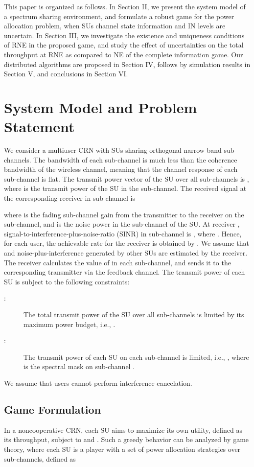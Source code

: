 \documentclass[peerreview,onecolumn,11pt,draftclsnofoot]{IEEEtran}\usepackage{amsmath}\usepackage{amsfonts}\usepackage{epsfig}\usepackage{amssymb}\usepackage{graphicx}\usepackage{amssymb,amsmath}\usepackage{cite}\usepackage{color,soul}\newcommand\T{\rule{0pt}{3.1ex}}
\begin{document}
This paper is organized as follows. In Section II, we present the system model of a spectrum sharing environment, and formulate a robust game for the power allocation problem, when SUs channel state information and IN levels are uncertain. In Section III, we investigate the existence and uniqueness conditions of RNE in the proposed game, and study the effect of uncertainties on the total throughput at RNE as compared to NE of the complete information game. Our distributed algorithms are proposed in Section IV, follows by simulation results in Section V, and conclusions in Section VI.

\section{System Model and Problem Statement}
We consider a multiuser CRN with  SUs sharing  orthogonal narrow band sub-channels. The bandwidth of each sub-channel is much less than the coherence bandwidth of the wireless channel, meaning that the channel response of each sub-channel is flat. The transmit power vector of the  SU over all sub-channels is , where  is the transmit power of the  SU in the  sub-channel. The received signal at the corresponding receiver in sub-channel  is

where  is the fading sub-channel gain from the  transmitter to the
 receiver on the
 sub-channel, and
 is the noise power in the  sub-channel of the
 SU. At receiver , signal-to-interference-plus-noise-ratio (SINR) in sub-channel  is
,
where . Hence, for each
user, the achievable rate for the
 receiver is obtained by
. We assume that  and noise-plus-interference generated by other SUs are estimated by the  receiver. The receiver calculates the value of  in each sub-channel, and sends it to the corresponding transmitter via the feedback channel. The transmit power of each SU is subject to the following constraints:
\begin{description}
    \item [:] The total transmit power of the  SU over all sub-channels is limited by its maximum power budget, i.e.,
.
\item [:]The transmit power of each SU on each sub-channel is limited, i.e.,
,
where  is the spectral mask on sub-channel .
\end{description}
We assume that users cannot perform interference cancelation.

\subsection{Game Formulation}
In a noncooperative CRN, each SU aims to maximize its own
utility, defined as its throughput, subject to  and . Such a greedy behavior can be analyzed by game theory, where each SU is a player with a set of power allocation strategies over  sub-channels, defined as
\end{document}

